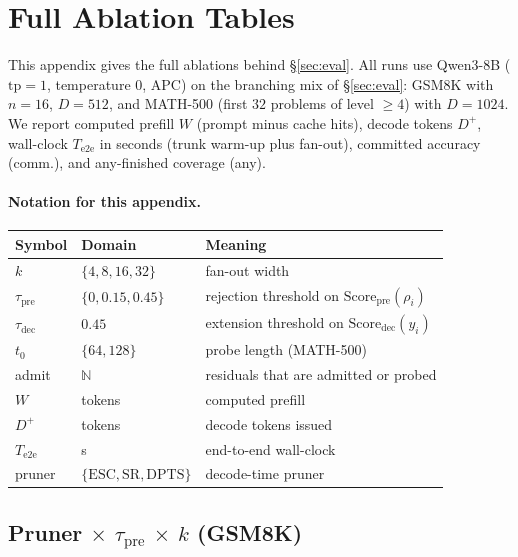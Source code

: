 \section{Full Ablation Tables}
\label{sec:ablation-full}

This appendix gives the full ablations behind \S\ref{sec:eval}.
All runs use Qwen3-8B ($\mathrm{tp}{=}1$, temperature $0$, APC) on the branching mix of \S\ref{sec:eval}:
GSM8K with $n{=}16$, $D{=}512$, and MATH-500 (first $32$ problems of level $\ge4$) with $D{=}1024$.
We report computed prefill $W$ (prompt minus cache hits), decode tokens $D^{+}$, wall-clock $T_{\mathrm{e2e}}$ in seconds (trunk warm-up plus fan-out),
committed accuracy (comm.), and any-finished coverage (any).

\paragraph{Notation for this appendix.}
\begin{center}
\scriptsize
\begin{tabular}{@{}llp{}@{}}
\toprule
Symbol & Domain & Meaning \\
\midrule
$k$ & $\{4,8,16,32\}$ & fan-out width \\
$\tau_{\mathrm{pre}}$ & $\{0,0.15,0.45\}$ & rejection threshold on $\mathrm{Score}_{\mathrm{pre}}(\rho_i)$ \\
$\tau_{\mathrm{dec}}$ & $0.45$ & extension threshold on $\mathrm{Score}_{\mathrm{dec}}(y_i)$ \\
$t_0$ & $\{64,128\}$ & probe length (MATH-500) \\
admit & $\mathbb{N}$ & residuals that are admitted or probed \\
$W$ & tokens & computed prefill \\
$D^{+}$ & tokens & decode tokens issued \\
$T_{\mathrm{e2e}}$ & s & end-to-end wall-clock \\
pruner & $\{\mathrm{ESC},\mathrm{SR},\mathrm{DPTS}\}$ & decode-time pruner \\
\bottomrule
\end{tabular}
\end{center}

\subsection{Pruner $\times$ $\tau_{\mathrm{pre}}$ $\times$ $k$ (GSM8K)}
\label{sec:ablate-thresh}

